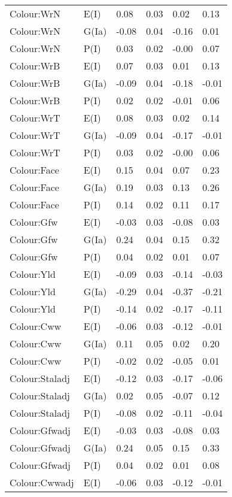 \begin{center}
\begin{longtable}{|p{1.1in}|p{0.7in}|p{0.7in}|p{0.6in}|p{0.6in}|p{0.6in}|}
  Colour:WrN & E(I) & 0.08 & 0.03 & 0.02 & 0.13 \\ 
  Colour:WrN & G(Ia) & -0.08 & 0.04 & -0.16 & 0.01 \\ 
  Colour:WrN & P(I) & 0.03 & 0.02 & -0.00 & 0.07 \\ 
  Colour:WrB & E(I) & 0.07 & 0.03 & 0.01 & 0.13 \\ 
  Colour:WrB & G(Ia) & -0.09 & 0.04 & -0.18 & -0.01 \\ 
  Colour:WrB & P(I) & 0.02 & 0.02 & -0.01 & 0.06 \\ 
  Colour:WrT & E(I) & 0.08 & 0.03 & 0.02 & 0.14 \\ 
  Colour:WrT & G(Ia) & -0.09 & 0.04 & -0.17 & -0.01 \\ 
  Colour:WrT & P(I) & 0.03 & 0.02 & -0.00 & 0.06 \\ 
  Colour:Face & E(I) & 0.15 & 0.04 & 0.07 & 0.23 \\ 
  Colour:Face & G(Ia) & 0.19 & 0.03 & 0.13 & 0.26 \\ 
  Colour:Face & P(I) & 0.14 & 0.02 & 0.11 & 0.17 \\ 
  Colour:Gfw & E(I) & -0.03 & 0.03 & -0.08 & 0.03 \\ 
  Colour:Gfw & G(Ia) & 0.24 & 0.04 & 0.15 & 0.32 \\ 
  Colour:Gfw & P(I) & 0.04 & 0.02 & 0.01 & 0.07 \\ 
  Colour:Yld & E(I) & -0.09 & 0.03 & -0.14 & -0.03 \\ 
  Colour:Yld & G(Ia) & -0.29 & 0.04 & -0.37 & -0.21 \\ 
  Colour:Yld & P(I) & -0.14 & 0.02 & -0.17 & -0.11 \\ 
  Colour:Cww & E(I) & -0.06 & 0.03 & -0.12 & -0.01 \\ 
  Colour:Cww & G(Ia) & 0.11 & 0.05 & 0.02 & 0.20 \\ 
  Colour:Cww & P(I) & -0.02 & 0.02 & -0.05 & 0.01 \\ 
  Colour:Staladj & E(I) & -0.12 & 0.03 & -0.17 & -0.06 \\ 
  Colour:Staladj & G(Ia) & 0.02 & 0.05 & -0.07 & 0.12 \\ 
  Colour:Staladj & P(I) & -0.08 & 0.02 & -0.11 & -0.04 \\ 
  Colour:Gfwadj & E(I) & -0.03 & 0.03 & -0.08 & 0.03 \\ 
  Colour:Gfwadj & G(Ia) & 0.24 & 0.05 & 0.15 & 0.33 \\ 
  Colour:Gfwadj & P(I) & 0.04 & 0.02 & 0.01 & 0.08 \\ 
  Colour:Cwwadj & E(I) & -0.06 & 0.03 & -0.12 & -0.01 \\ 

\end{longtable}
\end{center}

